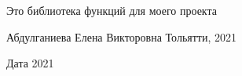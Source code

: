 Это библиотека функций для моего проекта \begin{DoxyVerb}   Абдулганиева Елена Викторовна
   Тольятти, 2021
\end{DoxyVerb}
 \begin{DoxyDate}{Дата}
2021 
\end{DoxyDate}
